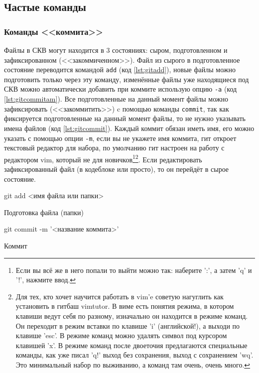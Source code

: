 \documentclass[12pt]{article}
\begin{document}
\subsection{Частые команды}
\subsubsection{Команды <<коммита>>}

Файлы в СКВ могут находится в 3 состояниях: сыром, подготовленном и зафиксированном (<<закоммиченном>>). Файл из сырого в подготовленное состояние переводится командой \verb|add| (код \ref{lst:gitadd}), новые файлы можно подготовить только через эту команду, изменённые файлы уже находящиеся под СКВ можно автоматически добавить при коммите  использую опцию \verb|-a| (код \ref{lst:gitcommitam}). Все подготовленные на данный момент файлы можно зафиксировать (<<закоммитить>>) c помощью команды \verb|commit|, так как фиксируется подготовленные на данный момент файлы, то не нужно указывать имена файлов (код \ref{lst:gitcommit}). Каждый коммит обязан иметь имя, его можно указать с помощью опции \verb|-m|, если вы не укажете имя коммита, гит откроет текстовый редактор для набора, по умолчанию гит настроен на работу с редактором vim, который не для новичков\footnote{Если вы всё же в него попали то выйти можно так: наберите ':', а затем 'q' и '!', нажмите ввод.}\footnote{Для тех, кто хочет научится работать в vim'e советую нагуглить как установить в гитбаш vimtutor. В виме есть понятия режима, в котором клавиши ведут себя по разному, изначально он находится в режиме команд. Он переходит в режим вставки по клавише 'i' (английской!), а выходи по клавише 'esc'. В режиме команд можно удалять символ под курсором клавишей 'x'. В режиме команд после двоеточия предлагаются специальные команды, как уже писал 'q!' выход без сохранения, выход с сохранением 'wq'. Это минимальный набор по выживанию, а команд там очень, очень много.}. Если редактировать зафиксированный файл (в кодеблоке или просто), то он перейдёт в сырое состояние.

\begin{listing}[H]
\begin{center}
\begin{bashcode}
git add <имя файла или папки>
\end{bashcode}
\end{center}
\caption{Подготовка файла (папки)}
\label{lst:gitadd}
\end{listing}

\begin{listing}[H]
\begin{center}
\begin{bashcode}
git commit -m '<название коммита>'
\end{bashcode}
\end{center}
\caption{Коммит}
\label{lst:gitcommit}
\end{listing}
\end{document}
